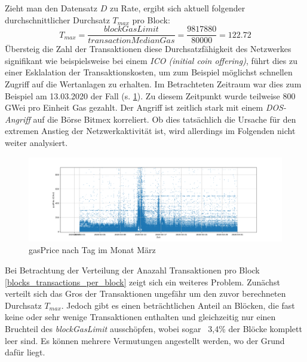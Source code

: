 \documentclass[runningheads]{llncs}
\begin{document}
Zieht man den Datensatz $ D $ zu Rate, ergibt sich aktuell folgender durchschnittlicher Durchsatz $ T_{max} $ pro Block: \cite{neemann_appendix_nodate}
$$
  T_{max} = \frac{\textit{blockGasLimit}}{\textit{transactionMedianGas}} = \frac{9817880}{80000} = 122.72
$$
Übersteig die Zahl der  Transaktionen diese Durchsatzfähigkeit des Netzwerkes signifikant wie beispielsweise bei einem \textit{ICO (initial coin offering)}, führt dies zu einer Esklalation der Transaktionskosten, um zum Beispiel möglichst schnellen Zugriff auf die Wertanlagen zu erhalten. \cite[S. 9:6 f.]{m.spain_oasics-tokeneconomics_2019} Im Betrachteten Zeitraum war dies zum Beispiel am 13.03.2020 der Fall (s. \ref{transactions_gasprice_timeseries}). Zu diesem Zeitpunkt wurde teilweise 800 GWei pro Einheit Gas gezahlt. Der Angriff ist zeitlich stark mit einem \textit{DOS-Angriff} auf die Börse Bitmex korreliert. Ob dies tatsächlich die Ursache für den extremen Anstieg der Netzwerkaktivität ist, wird allerdings im Folgenden nicht weiter analysiert. \cite{bitmex_ddos_nodate}

\begin{figure}[h!]
  \centerline{\includegraphics[width=\textwidth, keepaspectratio]{transactions_gasprice_timeseries.png}}
  \caption{gasPrice nach Tag im Monat März \cite{neemann_appendix_nodate}}
  \label{transactions_gasprice_timeseries}
\end{figure}

Bei Betrachtung der Verteilung der Anazahl Transaktionen pro Block \ref{blocks_transactions_per_block} zeigt sich ein weiteres Problem. Zunächst verteilt sich das Gros der Transaktionen ungefähr um den zuvor berechneten Durchsatz $ T_{max} $. Jedoch gibt es einen beträchtlichen Anteil an Blöcken, die fast keine oder sehr wenige Transaktionen enthalten und gleichzeitig nur einen Bruchteil des \textit{blockGasLimit} ausschöpfen, wobei sogar ~3,4\% der Blöcke komplett leer sind. \cite{neemann_appendix_nodate} Es können mehrere Vermutungen angestellt werden, wo der Grund dafür liegt.
\end{document}
